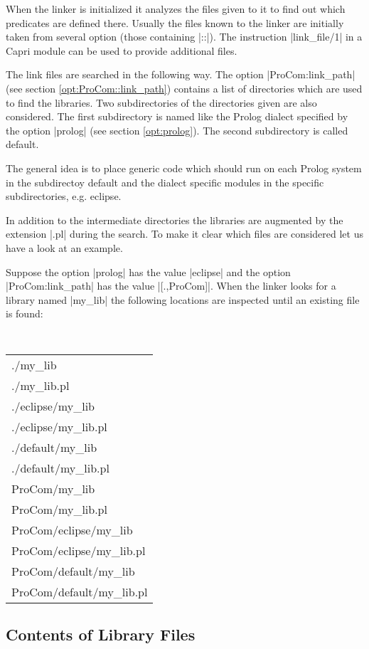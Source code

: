 When the linker is initialized it analyzes the files given to it to find out
which predicates are defined there. Usually the files known to the linker are
initially taken from several option (those containing |::|). The instruction
|link_file/1| in a Capri module can be used to provide additional files.

The link files are searched in the following way. The option
|ProCom:link_path| (see section \ref{opt:ProCom::link_path}) contains a list
of directories which are used to find the libraries. Two subdirectories of the
directories given are also considered. The first subdirectory is named like
the Prolog dialect specified by the option |prolog| (see section
\ref{opt:prolog}). The second subdirectory is called {\sf default}.

The general idea is to place generic code which should run on each Prolog
system in the subdirectoy {\sf default} and the dialect specific modules in
the specific subdirectories, e.g. {\sf eclipse}.

In addition to the intermediate directories the libraries are augmented by the
extension |.pl| during the search. To make it clear which files are considered
let us have a look at an example.

Suppose the option |prolog| has the value |eclipse| and the option
|ProCom:link_path| has the value |[.,ProCom]|. When the linker looks for a
library named |my_lib| the following locations are inspected until an existing
file is found:

{\tt
\begin{tabular}{l}
  ./my\_lib
  \\./my\_lib.pl
  \\./eclipse/my\_lib
  \\./eclipse/my\_lib.pl
  \\./default/my\_lib
  \\./default/my\_lib.pl
  \\ProCom/my\_lib
  \\ProCom/my\_lib.pl
  \\ProCom/eclipse/my\_lib
  \\ProCom/eclipse/my\_lib.pl
  \\ProCom/default/my\_lib
  \\ProCom/default/my\_lib.pl
\end{tabular}
}


\subsection{Contents of Library Files}\label{sec:contents.library}

